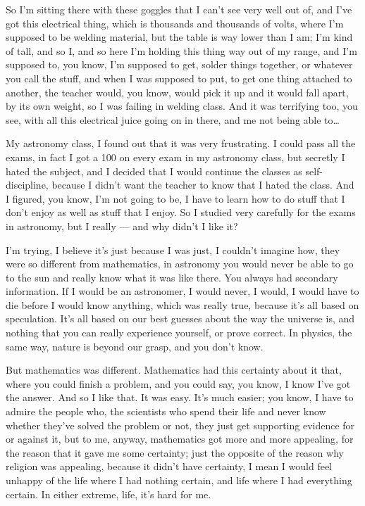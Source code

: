 \documentclass[]{article}
\begin{document}
So I'm sitting there with these goggles that I can't see very well out
of, and I've got this electrical thing, which is thousands and thousands
of volts, where I'm supposed to be welding material, but the table is
way lower than I am; I'm kind of tall, and so I, and so here I'm holding
this thing way out of my range, and I'm supposed to, you know, I'm
supposed to get, solder things together, or whatever you call the stuff,
and when I was supposed to put, to get one thing attached to another,
the teacher would, you know, would pick it up and it would fall apart,
by its own weight, so I was failing in welding class. And it was
terrifying too, you see, with all this electrical juice going on in
there, and me not being able to\ldots{}

My astronomy class, I found out that it was very frustrating. I could
pass all the exams, in fact I got a 100 on every exam in my astronomy
class, but secretly I hated the subject, and I decided that I would
continue the classes as self-discipline, because I didn't want the
teacher to know that I hated the class. And I figured, you know, I'm not
going to be, I have to learn how to do stuff that I don't enjoy as well
as stuff that I enjoy. So I studied very carefully for the exams in
astronomy, but I really --- and why didn't I like it?

I'm trying, I believe it's just because I was just, I couldn't imagine
how, they were so different from mathematics, in astronomy you would
never be able to go to the sun and really know what it was like there.
You always had secondary information. If I would be an astronomer, I
would never, I would, I would have to die before I would know anything,
which was really true, because it's all based on speculation. It's all
based on our best guesses about the way the universe is, and nothing
that you can really experience yourself, or prove correct. In physics,
the same way, nature is beyond our grasp, and you don't know.

But mathematics was different. Mathematics had this certainty about it
that, where you could finish a problem, and you could say, you know, I
know I've got the answer. And so I like that. It was easy. It's much
easier; you know, I have to admire the people who, the scientists who
spend their life and never know whether they've solved the problem or
not, they just get supporting evidence for or against it, but to me,
anyway, mathematics got more and more appealing, for the reason that it
gave me some certainty; just the opposite of the reason why religion was
appealing, because it didn't have certainty, I mean I would feel unhappy
of the life where I had nothing certain, and life where I had everything
certain. In either extreme, life, it's hard for me.
\end{document}
